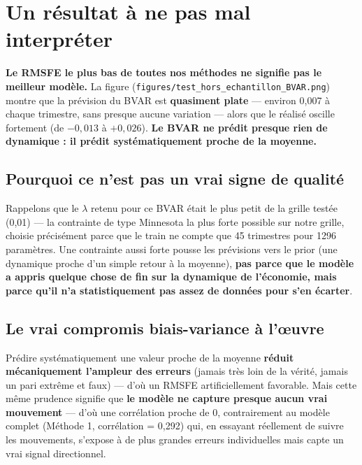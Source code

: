 \documentclass[11pt,a4paper]{article}
\begin{document}
\section{Un résultat à ne pas mal interpréter}

\begin{alertebox}
\textbf{Le RMSFE le plus bas de toutes nos méthodes ne signifie pas le meilleur modèle.} La figure (\texttt{figures/test\_hors\_echantillon\_BVAR.png}) montre que la prévision du BVAR est \textbf{quasiment plate} --- environ 0,007 à chaque trimestre, sans presque aucune variation --- alors que le réalisé oscille fortement (de $-0{,}013$ à $+0{,}026$). \textbf{Le BVAR ne prédit presque rien de dynamique : il prédit systématiquement proche de la moyenne.}
\end{alertebox}

\subsection{Pourquoi ce n'est pas un vrai signe de qualité}

\begin{intuition}
Rappelons que le $\lambda$ retenu pour ce BVAR était le plus petit de la grille testée (0,01) --- la contrainte de type Minnesota la plus forte possible sur notre grille, choisie précisément parce que le train ne compte que 45 trimestres pour 1296 paramètres. Une contrainte aussi forte pousse les prévisions vers le prior (une dynamique proche d'un simple retour à la moyenne), \textbf{pas parce que le modèle a appris quelque chose de fin sur la dynamique de l'économie, mais parce qu'il n'a statistiquement pas assez de données pour s'en écarter}.
\end{intuition}

\subsection{Le vrai compromis biais-variance à l'œuvre}

Prédire systématiquement une valeur proche de la moyenne \textbf{réduit mécaniquement l'ampleur des erreurs} (jamais très loin de la vérité, jamais un pari extrême et faux) --- d'où un RMSFE artificiellement favorable. Mais cette même prudence signifie que \textbf{le modèle ne capture presque aucun vrai mouvement} --- d'où une corrélation proche de 0, contrairement au modèle complet (Méthode 1, corrélation = 0,292) qui, en essayant réellement de suivre les mouvements, s'expose à de plus grandes erreurs individuelles mais capte un vrai signal directionnel.
\end{document}
